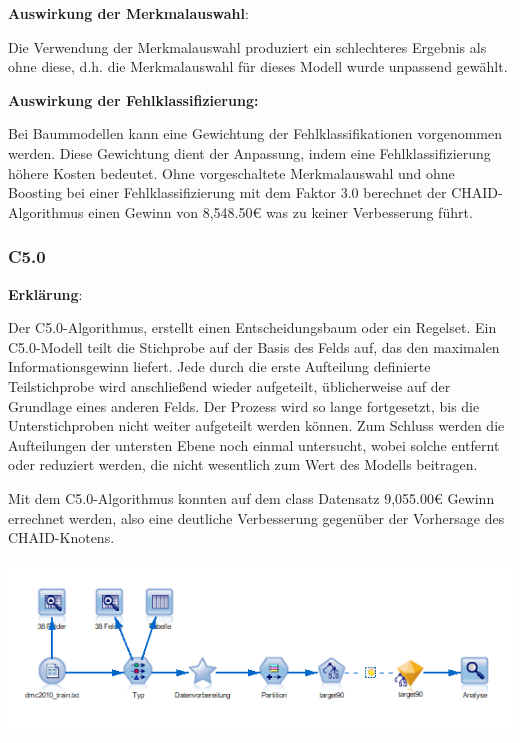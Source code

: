 \documentclass[a4paper,12pt]{article}
\newcounter{Algorithmus}
\begin{document}
{\bf Auswirkung der Merkmalauswahl}:
\par
\vspace{0.2cm}
Die Verwendung der Merkmalauswahl produziert ein schlechteres Ergebnis als ohne diese, d.h. die Merkmalauswahl für dieses Modell wurde unpassend gewählt.
\par
\vspace{0.2cm}

{\bf Auswirkung der Fehlklassifizierung:}
\par
\vspace{0.2cm}
Bei Baummodellen kann eine Gewichtung der Fehlklassifikationen vorgenommen werden. Diese
Gewichtung dient der Anpassung, indem eine Fehlklassifizierung höhere
Kosten bedeutet. Ohne vorgeschaltete Merkmalauswahl und ohne Boosting bei einer Fehlklassifizierung mit dem Faktor 3.0 berechnet der CHAID-Algorithmus einen Gewinn von 8,548.50\;\euro\;
was zu keiner Verbesserung führt.

\subsubsection{C5.0}
{\bf Erklärung}:
\par
\vspace{0.2cm}
Der C5.0-Algorithmus, erstellt einen Entscheidungsbaum oder ein Regelset.
 Ein C5.0-Modell teilt die Stichprobe auf der Basis des Felds auf, das den maximalen
Informationsgewinn liefert. Jede durch die erste Aufteilung definierte Teilstichprobe wird anschließend
wieder aufgeteilt, üblicherweise auf der Grundlage eines anderen Felds. Der Prozess wird so lange fortgesetzt,
bis die Unterstichproben nicht weiter aufgeteilt werden können. Zum Schluss werden die Aufteilungen
der untersten Ebene noch einmal untersucht, wobei solche entfernt oder reduziert werden, die nicht
wesentlich zum Wert des Modells beitragen.
\par
\vspace{1cm}
Mit dem C5.0-Algorithmus konnten auf dem class Datensatz 9,055.00\;\euro\; Gewinn errechnet werden, also eine deutliche Verbesserung gegenüber der Vorhersage des CHAID-Knotens.

\begin{center}
\includegraphics[width=\textwidth]{Screens/c50}
\end{center}
\end{document}

